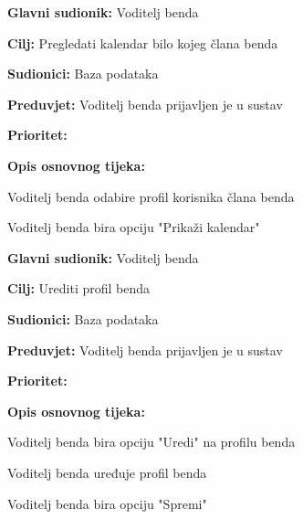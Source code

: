 \noindent {}
	\begin{packed_item}
		
		\item \textbf{Glavni sudionik: } Voditelj benda 
		\item \textbf{Cilj:} Pregledati kalendar bilo kojeg člana benda
		\item \textbf{Sudionici:} Baza podataka
		\item \textbf{Preduvjet:} Voditelj benda prijavljen je u sustav
		\item \textbf{Prioritet:} 
		\item \textbf{Opis osnovnog tijeka:} 
		
		\item[] \begin{packed_enum}
			
			\item Voditelj benda odabire profil korisnika člana benda 
			\item Voditelj benda bira opciju "Prikaži kalendar"
		\end{packed_enum}  
	\end{packed_item}

\noindent {}
	\begin{packed_item}
		
		\item \textbf{Glavni sudionik: } Voditelj benda
		\item \textbf{Cilj:} Urediti profil benda
		\item \textbf{Sudionici:} Baza podataka
		\item \textbf{Preduvjet:} Voditelj benda prijavljen je u sustav
		\item \textbf{Prioritet:} 
		\item \textbf{Opis osnovnog tijeka:} 
		
		\item[] \begin{packed_enum}
			
			\item Voditelj benda bira opciju "Uredi" na profilu benda
			\item Voditelj benda uređuje profil benda
			\item Voditelj benda bira opciju "Spremi"
		\end{packed_enum}  
	\end{packed_item}

